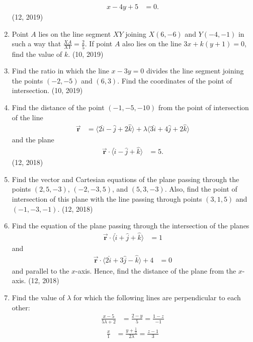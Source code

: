 \begin{enumerate}[label=\thesubsection.\arabic*, ref=\thesubsection.\theenumi]
\begin{align*}
	x - 4y + 5 &= 0.
	\end{align*} \hfill (12, 2019)
\item Point $A$ lies on the line segment $XY$ joining $X(6, -6)$ and $Y(-4, -1)$ in such a way that $\frac{XA}{XY} = \frac{2}{5}$. If point $A$ also lies on the line $3x + k(y + 1) = 0$, find the value of $k$. \hfill (10, 2019)
\item Find the ratio in which the line $x - 3y = 0$ divides the line segment joining the points $(-2, -5)$ and $(6, 3)$. Find the coordinates of the point of intersection. \hfill (10, 2019)
\item Find the distance of the point $(-1, -5, -10)$ from the point of intersection of the line 
\begin{align*}
\overrightarrow{\mathbf{r}} &= \langle 2\hat{i} - \hat{j} + 2\hat{k} \rangle + \lambda \langle 3\hat{i} + 4\hat{j} + 2\hat{k} \rangle
\end{align*}
and the plane 
\begin{align*}
\overrightarrow{\mathbf{r}} \cdot \langle \hat{i} - \hat{j} + \hat{k} \rangle &= 5.
\end{align*}
\hfill (12, 2018)
\item Find the vector and Cartesian equations of the plane passing through the points $(2, 5, -3)$, $(-2, -3, 5)$, and $(5, 3, -3)$. Also, find the point of intersection of this plane with the line passing through points $(3, 1, 5)$ and $(-1, -3, -1)$. \hfill (12, 2018)
\item Find the equation of the plane passing through the intersection of the planes 
\begin{align*}
\overrightarrow{\mathbf{r}} \cdot \langle \hat{i} + \hat{j} + \hat{k} \rangle &= 1
\end{align*}
and 
\begin{align*}
\overrightarrow{\mathbf{r}} \cdot \langle 2\hat{i} + 3\hat{j} - \hat{k} \rangle + 4 &= 0
\end{align*}
and parallel to the $x$-axis. Hence, find the distance of the plane from the $x$-axis. \hfill (12, 2018)
\item Find the value of $\lambda$ for which the following lines are perpendicular to each other:
\begin{align*}
\frac{x - 5}{5\lambda + 2} &= \frac{2 - y}{5} = \frac{1 - z}{-1}
\end{align*}
\begin{align*}
\frac{x}{1} &= \frac{y + \frac{1}{2}}{2\lambda} = \frac{z - 1}{3}
\end{align*}

\end{enumerate}
